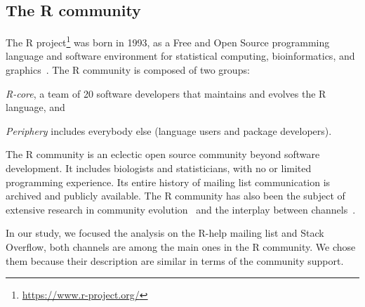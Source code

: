 
\subsection{The R community}

The R project\footnote{\url{https://www.r-project.org/}} was born in 1993, as a Free and Open Source programming language and software environment for statistical computing, bioinformatics, and graphics~\cite{Ihaka1996}.
The R community is composed of two groups:
\begin{enumerate*}[label=(\arabic*)]
  \item \textit{R-core}, a team of 20 software developers that maintains and evolves the R language, and
  \item \textit{Periphery} includes everybody else (language users and package developers).
\end{enumerate*}

    The R community is an eclectic open source community beyond software development.
    It includes biologists and statisticians, with no or limited programming experience.
    Its entire history of mailing list communication is archived and publicly available.
    The R community has also been the subject of extensive research in community evolution~\cite{German2013} and the interplay between channels~\cite{Vasilescu2014c}.

    In our study, we focused the analysis on the R-help mailing list and Stack Overflow, both channels are among the main ones in the R community.
    We chose them because their description are similar in terms of the community support.

